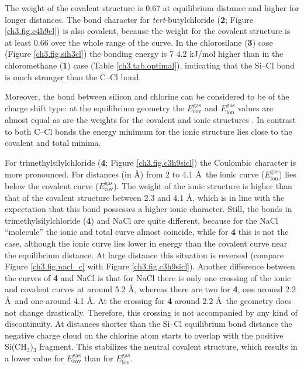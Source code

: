 The weight of the covalent structure is 0.67 at equilibrium distance and higher for longer distances. The bond character for \textit{tert}-butylchloride (\textbf{2}; Figure \ref{ch3.fig.c4h9cl}) is also covalent, because the weight for the covalent structure is at least 0.66 over the whole range of the curve.
In the chlorosilane (\textbf{3}) case (Figure \ref{ch3.fig.sih3cl}) the bonding energy is 7
4.2 kJ/mol higher than in the chloromethane (\textbf{1}) case (Table \ref{ch3.tab.optimal}), indicating that the Si--Cl bond is much stronger than the C--Cl bond. 

Moreover, the bond between silicon and chlorine can be considered to be of the charge shift type: at the equilibrium geometry the $E_\mathrm{cov}^\mathrm{gas}$ and $E_\mathrm{ion}^\mathrm{gas}$ values are almost equal as are the weights for the covalent and ionic structures \cite{cs1,cs2}. In contrast to both C--Cl bonds the energy minimum for the ionic structure lies close to the covalent and total minima.  

For trimethylsilylchloride (\textbf{4}; Figure \ref{ch3.fig.c3h9sicl}) the Coulombic character is more pronounced. For distances (in \AA) from 2 to 4.1 \AA\  the ionic curve ($E_\mathrm{ion}^\mathrm{gas}$) lies below the covalent curve ($E_\mathrm{cov}^\mathrm{gas}$). The weight of the ionic structure is higher than that of the covalent structure between 2.3 and 4.1 \AA, which is in line with the expectation that this bond possesses a higher ionic character. Still, the bonds in trimethylsilylchloride (\textbf{4}) and NaCl are quite different, because for the NaCl ``molecule'' the ionic and total curve almost coincide, while for \textbf{4} this is not the case, although the ionic curve lies lower in energy than the covalent curve near the equilibrium distance. At large distance this situation is reversed (compare Figure \ref{ch3.fig.nacl_c} with Figure \ref{ch3.fig.c3h9sicl}). Another difference between the curves of \textbf{4} and NaCl is that for NaCl there is only one crossing of the ionic and covalent curves at around 5.2 \AA, whereas there are two for \textbf{4}, one around 2.2 \AA\ and one around 4.1 \AA. At the crossing for \textbf{4} around 2.2 \AA\ the geometry does not change drastically. Therefore, this crossing is not accompanied by any kind of discontinuity. At distances shorter than the Si--Cl equilibrium bond distance the negative charge cloud on the chlorine atom starts to overlap with the positive Si(CH$_3$)$_3$ fragment. This stabilizes the neutral covalent structure, which results in a lower value for $E_\mathrm{cov}^\mathrm{gas}$ than for $E_\mathrm{ion}^\mathrm{gas}$. 

